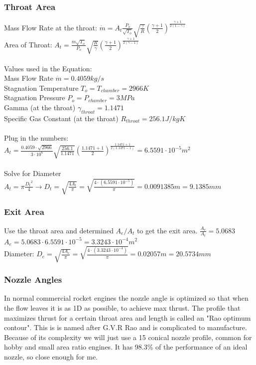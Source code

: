 \documentclass[12pt, letter paper]{article}
\begin{document}
			\subsubsection{Throat Area}
				Mass Flow Rate at the throat: $ \dot{m} = A_t \frac{P_o}{\sqrt{T_o}}\sqrt{\frac{\gamma}{R}} (\frac{\gamma + 1}{2})^{\frac{\gamma + 1}{2(1-\gamma)}}  $ \\
				Area of Throat: $ A_t = \frac{\dot{m}\sqrt{T_o}}{P_o}\sqrt{\frac{R}{\gamma}} (\frac{\gamma + 1}{2})^{\frac{\gamma + 1}{2(\gamma -1)}}$ \\ \\
				Values used in the Equation: \\
				Mass Flow Rate $ \dot{m} = 0.4059 kg/s $ \\
				Stagnation Temperature $ T_o = T_{chamber} = 2966 K $ \\
				Stagnation Pressure $ P_o = P_{chamber} = 3 MPa $ \\
				Gamma (at the throat) $ \gamma_{throat} = 1.1471 $ \\
				Specific Gas Constant (at the throat) $ R_{throat} = 256.1 J/kgK $ \\ \\
				Plug in the numbers: $ A_t = \frac{0.4059 \cdot \sqrt{2966}}{3 \cdot 10^6}\sqrt{\frac{256.1}{1.1471}} (\frac{1.1471 + 1}{2})^{\frac{1.1471 + 1}{2(1.1471 -1)}} = 6.5591 \cdot 10^{-5} m^2$ \\ \\
				Solve for Diameter $ A_t = \pi \frac{{D_t}^2}{4}  \rightarrow D_t = \sqrt{\frac{4A_t}{\pi}} = \sqrt{\frac{4 \cdot (6.5591 \cdot 10^{-5})}{\pi}} = 0.0091385 m = 9.1385 mm$
			
			\subsubsection{Exit Area}
				Use the throat area and determined $ A_e/A_t $ to get the exit area. $ \frac{A_e}{A_t} = 5.0683 $ \\
				$ A_e = 5.0683 \cdot 6.5591 \cdot 10^{-5} = 3.3243 \cdot 10^{-4} m^2$ \\
				Diameter: $ D_e = \sqrt{\frac{4 A_e}{\pi}} = \sqrt{\frac{4 \cdot(3.3243 \cdot 10^{-4})}{\pi}} = 0.02057 m = 20.5734 mm $ \\
			
			\subsubsection{Nozzle Angles}
				In normal commercial rocket engines the nozzle angle is optimized so that when the flow leaves it is as 1D as possible, to achieve max thrust. 
				The profile that maximizes thrust for a certain throat area and length is called an "Rao optimum contour". This is is named after G.V.R Rao and is complicated to manufacture. 
				Because of its complexity we will just use a 15{\degree} conical nozzle profile, common for hobby and small area ratio engines. It has 98.3\% of the performance of an ideal nozzle, so close enough for me.
\end{document}
